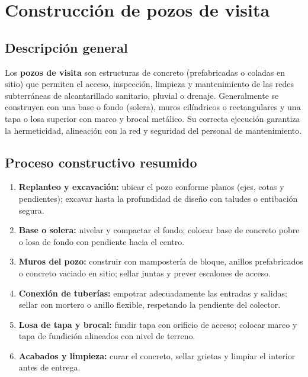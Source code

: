 \documentclass[12pt]{article}
\begin{document}
	
	
	
	
	
	\section{Construcción de pozos de visita}
	
	\subsection*{Descripción general}
	Los \textbf{pozos de visita} son estructuras de concreto (prefabricadas o coladas en sitio) que permiten el acceso, inspección, limpieza y mantenimiento de las redes subterráneas de alcantarillado sanitario, pluvial o drenaje.  
	Generalmente se construyen con una base o fondo (solera), muros cilíndricos o rectangulares y una tapa o losa superior con marco y brocal metálico.  
	Su correcta ejecución garantiza la hermeticidad, alineación con la red y seguridad del personal de mantenimiento.
	
	\subsection*{Proceso constructivo resumido}
	\begin{enumerate}[leftmargin=*, itemsep=2pt]
		\item \textbf{Replanteo y excavación:} ubicar el pozo conforme planos (ejes, cotas y pendientes); excavar hasta la profundidad de diseño con taludes o entibación segura.
		\item \textbf{Base o solera:} nivelar y compactar el fondo; colocar base de concreto pobre o losa de fondo con pendiente hacia el centro.
		\item \textbf{Muros del pozo:} construir con mampostería de bloque, anillos prefabricados o concreto vaciado en sitio; sellar juntas y prever escalones de acceso.
		\item \textbf{Conexión de tuberías:} empotrar adecuadamente las entradas y salidas; sellar con mortero o anillo flexible, respetando la pendiente del colector.
		\item \textbf{Losa de tapa y brocal:} fundir tapa con orificio de acceso; colocar marco y tapa de fundición alineados con nivel de terreno.
		\item \textbf{Acabados y limpieza:} curar el concreto, sellar grietas y limpiar el interior antes de entrega.
	\end{enumerate}
	
\end{document}
